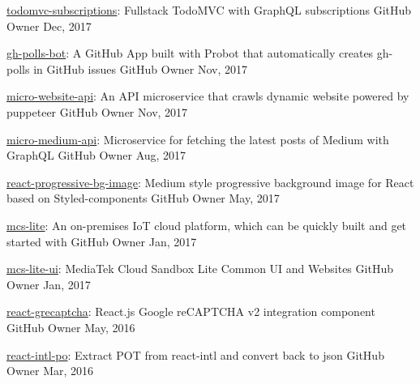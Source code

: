 \begin{cvhonors}
  \cvhonor
    {\href{https://github.com/evenchange4/todomvc-subscriptions}{todomvc-subscriptions}: \textmd{Fullstack TodoMVC with GraphQL subscriptions}}
    {GitHub} %
    {Owner} %
    {Dec, 2017} %

  \cvhonor
    {\href{https://github.com/evenchange4/gh-polls-bot}{gh-polls-bot}: \textmd{A GitHub App built with Probot that automatically creates gh-polls in GitHub issues}}
    {GitHub} %
    {Owner} %
    {Nov, 2017} %

  \cvhonor
    {\href{https://github.com/evenchange4/micro-website-api}{micro-website-api}: \textmd{An API microservice that crawls dynamic website powered by puppeteer}}
    {GitHub} %
    {Owner} %
    {Nov, 2017} %

  \cvhonor
    {\href{https://github.com/evenchange4/micro-medium-api}{micro-medium-api}: \textmd{Microservice for fetching the latest posts of Medium with GraphQL}}
    {GitHub} %
    {Owner} %
    {Aug, 2017} %

  \cvhonor
    {\href{https://github.com/evenchange4/react-progressive-bg-image}{react-progressive-bg-image}: \textmd{Medium style progressive background image for React based on Styled-components}}
    {GitHub} %
    {Owner} %
    {May, 2017} %

  \cvhonor
    {\href{https://github.com/MCS-Lite/mcs-lite}{mcs-lite}: \textmd{An on-premises IoT cloud platform, which can be quickly built and get started with}}
    {GitHub} %
    {Owner} %
    {Jan, 2017} %

  \cvhonor
    {\href{https://github.com/MCS-Lite/mcs-lite}{mcs-lite-ui}: \textmd{MediaTek Cloud Sandbox Lite Common UI and Websites}}
    {GitHub} %
    {Owner} %
    {Jan, 2017} %

  \cvhonor
    {\href{https://github.com/evenchange4/react-grecaptcha}{react-grecaptcha}: \textmd{React.js Google reCAPTCHA v2 integration component}}
    {GitHub} %
    {Owner} %
    {May, 2016} %

  \cvhonor
    {\href{https://github.com/evenchange4/react-intl-po}{react-intl-po}: \textmd{Extract POT from react-intl and convert back to json}}
    {GitHub} %
    {Owner} %
    {Mar, 2016} %

\end{cvhonors}
